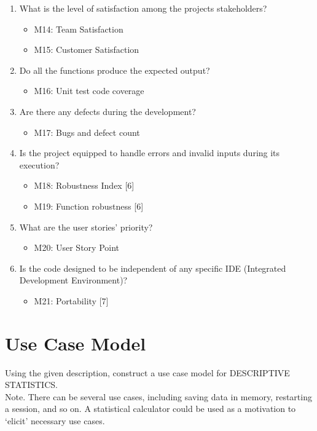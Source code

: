 \begin{enumerate}
        \item What is the level of satisfaction among the project\textquotesingle s stakeholders?
        \begin{itemize}
            \item M14: Team Satisfaction
            \item M15: Customer Satisfaction
        \end{itemize}

        \item Do all the functions produce the expected output?
        \begin{itemize}
            \item M16: Unit test code coverage
        \end{itemize}

        \item Are there any defects during the development?
        \begin{itemize}
            \item M17: Bugs and defect count
        \end{itemize}

        \item  Is the project equipped to handle errors and invalid inputs during its execution?
         \begin{itemize}
            \item M18: Robustness Index {[}6{]}
            \item M19: Function robustness {[}6{]}
        \end{itemize}

        \item What are the user stories' priority?
         \begin{itemize}
            \item M20: User Story Point
        \end{itemize}

        \item Is the code designed to be independent of any specific IDE
        (Integrated Development Environment)?
        \begin{itemize}
            \item M21:  Portability {[}7{]}
        \end{itemize}
        
    \end{enumerate}
    
    \pagebreak
    \section{Use Case Model}
    Using the given description, construct a use case model for DESCRIPTIVE STATISTICS.\\ Note. There can be several use cases, including saving data in memory, restarting a session, and so on. A statistical calculator could be used as a motivation to `elicit' necessary use cases.
    
